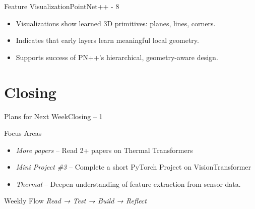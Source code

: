 \documentclass{beamer}
\begin{document}
		\begin{frame}{Feature Visualization}{PointNet++ - 8}
			\begin{itemize}
				\item Visualizations show learned 3D primitives: planes, lines, corners.
				\item Indicates that early layers learn meaningful local geometry.
				\item Supports success of PN++'s hierarchical, geometry-aware design.
			\end{itemize}
		\end{frame}


	\section{Closing}
		\begin{frame}{Plans for Next Week}{Closing – 1}
			\begin{block}{Focus Areas}
				\vspace{-0.3em}
				\begin{itemize}
					\item \textit{More papers} – Read 2+ papers on Thermal Transformers 
					\item \textit{Mini Project \#3} – Complete a short PyTorch Project on VisionTransformer
					\item \textit{Thermal} – Deepen understanding of feature extraction from sensor data.
				\end{itemize}
			\end{block}
			\vspace{1em}
			\begin{block}{Weekly Flow}
				\textit{Read → Test → Build → Reflect}
			\end{block}
		\end{frame}
		
\end{document}
